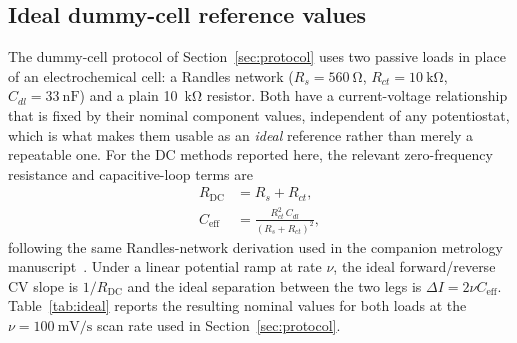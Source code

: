 \subsection{Ideal dummy-cell reference values}
\label{sec:ideal-values}
The dummy-cell protocol of Section~\ref{sec:protocol} uses two passive
loads in place of an electrochemical cell: a Randles network
($R_s=\SI{560}{\ohm}$, $R_{ct}=\SI{10}{\kilo\ohm}$,
$C_{dl}=\SI{33}{\nano\farad}$) and a plain \SI{10}{\kilo\ohm} resistor. Both
have a current-voltage relationship that is fixed by their nominal
component values, independent of any potentiostat, which is what makes them
usable as an \emph{ideal} reference rather than merely a repeatable one. For
the DC methods reported here, the relevant zero-frequency resistance and
capacitive-loop terms are
\begin{align}
R_{\mathrm{DC}} &= R_s + R_{ct}, \label{eq:idc-rdc}\\
C_{\mathrm{eff}} &= \frac{R_{ct}^{2}\,C_{dl}}{(R_s+R_{ct})^{2}}, \label{eq:idc-ceff}
\end{align}
following the same Randles-network derivation used in the companion
metrology manuscript~\cite{clement2026linearity}. Under a linear potential
ramp at rate $\nu$, the ideal forward/reverse CV slope is $1/R_{\mathrm{DC}}$
and the ideal separation between the two legs is $\Delta I = 2\nu
C_{\mathrm{eff}}$. Table~\ref{tab:ideal} reports the resulting nominal
values for both loads at the $\nu=\SI{100}{\milli\volt\per\second}$ scan
rate used in Section~\ref{sec:protocol}.

